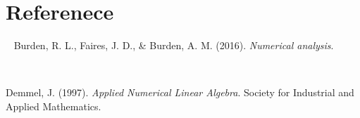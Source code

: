 \documentclass[12pt]{article} %
\newcommand{\1}[1]{\mathds{1}\left[#1\right]}
\begin{document}
\section{Referenece}
\
\hspace{3ex} Burden, R. L., Faires, J. D., \& Burden, A. M. (2016). \emph{Numerical analysis}.

\

Demmel, J. (1997). \emph{Applied Numerical Linear Algebra}. Society for Industrial and Applied Mathematics.


























































\end{document}

